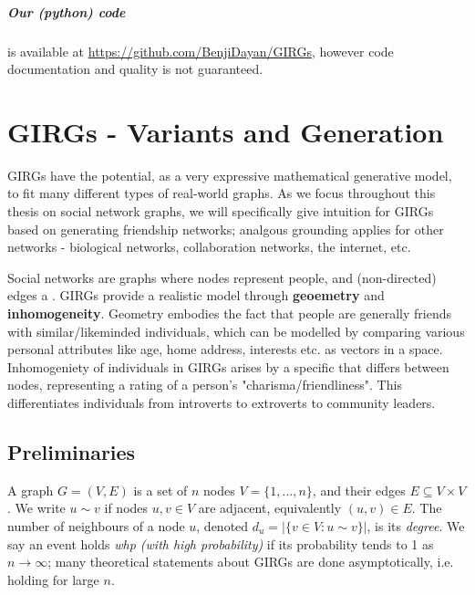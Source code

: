 \paragraph{Our (python) code} is available at \url{https://github.com/BenjiDayan/GIRGs}, however code documentation and quality is not guaranteed. 

\chapter{GIRGs - Variants and Generation}
\label{chap:GIRG_intro}
\minitoc
GIRGs have the potential, as a very expressive mathematical generative model, to fit many different types of real-world graphs. As we focus throughout this thesis on social network graphs, we will specifically give intuition for GIRGs based on generating friendship networks; analgous grounding applies for other networks - biological networks, collaboration networks, the internet, etc.

Social networks are graphs where nodes represent people, and (non-directed) edges a . GIRGs provide a realistic model through \textbf{geoemetry} and \textbf{inhomogeneity}.
Geometry embodies the fact that people are generally friends with similar/likeminded individuals,
which can be modelled by comparing various personal attributes like age, home address, interests etc. as vectors in a space. Inhomogeniety of individuals in GIRGs arises by a specific  that differs between nodes, representing a rating of a person's "charisma/friendliness". This differentiates individuals from introverts to extroverts to community leaders.

\section{Preliminaries}
A graph $G = (V,E)$ is a set of $n$ nodes $V = \{1, ..., n\}$, and their edges $E \subseteq V \times V$. We write $u \sim v$ if nodes $u,v \in V$ are adjacent, equivalently $(u,v) \in E$. The number of neighbours of a node $u$, denoted $d_u = |\{v \in V : u \sim v\}|$, is its \textit{degree}. We say an event holds \textit{whp (with high probability)} if its probability tends to 1 as $n \to \infty$; many theoretical statements about GIRGs are done asymptotically, i.e. holding for large $n$.


